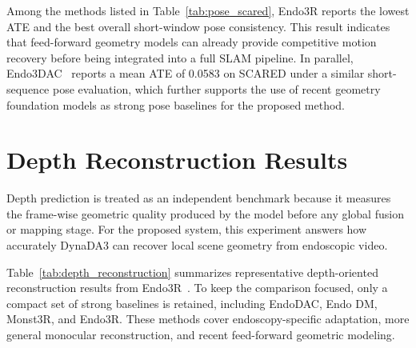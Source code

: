 Among the methods listed in Table~\ref{tab:pose_scared}, Endo3R reports the lowest ATE and the best overall short-window pose consistency. This result indicates that feed-forward geometry models can already provide competitive motion recovery before being integrated into a full SLAM pipeline. In parallel, Endo3DAC~\cite{endo3dac2025} reports a mean ATE of 0.0583 on SCARED under a similar short-sequence pose evaluation, which further supports the use of recent geometry foundation models as strong pose baselines for the proposed method.

\section{Depth Reconstruction Results}
Depth prediction is treated as an independent benchmark because it measures the frame-wise geometric quality produced by the model before any global fusion or mapping stage. For the proposed system, this experiment answers how accurately DynaDA3 can recover local scene geometry from endoscopic video.

Table~\ref{tab:depth_reconstruction} summarizes representative depth-oriented reconstruction results from Endo3R~\cite{endo3r2025}. To keep the comparison focused, only a compact set of strong baselines is retained, including EndoDAC, Endo DM, Monst3R, and Endo3R. These methods cover endoscopy-specific adaptation, more general monocular reconstruction, and recent feed-forward geometric modeling.

